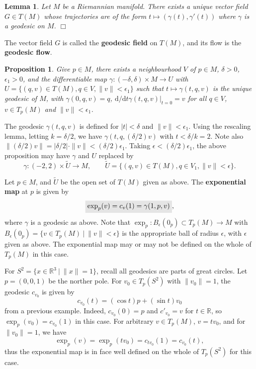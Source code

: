 \documentclass[letter-paper]{tufte-book}
\newtheorem{lemma}[theorem]{\color{pastel-blue}Lemma}
\newtheorem{proposition}[theorem]{\color{pastel-blue}Proposition}
\newenvironment{example}[1][Example]{\begin{trivlist}
\item[\hskip \labelsep {\bfseries #1}]}{\end{trivlist}}
\newcommand{\qedwhite}{\hfill \ensuremath{\Box}}
\newcommand{\highlight}[1]{\mathchoice%
  {\colorbox{black!10}{$\displaystyle#1$}}%
  {\colorbox{black!10}{$\textstyle#1$}}%
  {\colorbox{black!10}{$\scriptstyle#1$}}%
  {\colorbox{black!10}{$\scriptscriptstyle#1$}}}%
\begin{document}
\begin{lemma}
  Let $M$ be a Riemannian manifold. There exists a unique vector field $G \in T(M)$ whose trajectories are of the form $t\mapsto (\gamma(t), \gamma'(t))$ where $\gamma$ is a geodesic on $M$. \qedwhite
\end{lemma}

The vector field $G$ is called the \textbf{geodesic field} on $T(M)$, and its flow is the \textbf{geodesic flow}.

\begin{proposition}
  Give $p\in M$, there exists a neighbourhood $V$ of $p\in M$, $\delta>0$, $\epsilon_1 > 0$, and the differentiable map $\gamma:(-\delta, \delta) \times M \to U$ with $U = \{(q,v)\in T(M), q\in V, \|v\| < \epsilon_1\}$ such that $t\mapsto \gamma(t,q,v)$ is the unique geodesic of $M$, with $\gamma(0, q, v) = q$, $\mathrm{d}/\mathrm{d}t \gamma(t,q,v)|_{t=0} = v$ for all $q\in V$, $v\in T_p(M)$ and $\|v\| < \epsilon_1$.
\end{proposition}

The geodesic $\gamma(t,q,v)$ is defined for $|t|<\delta$ and $\|v\|<\epsilon_1$. Using the rescaling lemma, letting $k=\delta/2$, we have $\gamma(t,q, (\delta/2) v)$ with $t < \delta/k = 2$. Note also $\|(\delta/2)v\| = |\delta/2|\cdot \|v\| < (\delta /2)\epsilon_1$. Taking $\epsilon < (\delta/2)\epsilon_1$, the above proposition may have $\gamma$ and $U$ replaced by
\begin{equation*}
  \gamma:(-2, 2) \times \tilde{U} \to M, \qquad \tilde{U} = \{(q,v) \in T(M), q\in V_1, \|v\|<\epsilon\}.
\end{equation*}

Let $p\in M$, and $\tilde{U}$ be the open set of $T(M)$ given as above. The \textbf{exponential map} at $p$ is given by
\begin{equation}
  \highlight{\exp_p (v) = c_v(1) = \gamma(1, p, v)},
\end{equation}
where $\gamma$ is a geodesic as above. Note that $\exp_p : B_\epsilon(0_p) \subset T_p(M) \to M$ with $B_\epsilon(0_p) = \{v\in T_p(M)\ |\ \|v\|<\epsilon\}$ is the appropriate ball of radius $\epsilon$, with $\epsilon$ given as above. The exponential map may or may not be defined on the whole of $T_p(M)$ in this case.

\begin{example}
  For $S^2 = \{x\in \mathbb{R}^3\ |\ \|x\|=1\}$, recall all geodesics are parts of great circles. Let $p=(0,0,1)$ be the norther pole. For $v_0 \in T_p(S^2)$ with $\|v_0\|=1$, the geodesic $c_{v_0}$ is given by
  \begin{equation*}
    c_{v_0}(t) = (\cos t) p + (\sin t)v_0
  \end{equation*}
  from a previous example. Indeed, $c_{v_0}(0) = p$ and $c'_{v_0} = v$ for $t\in\mathbb{R}$, so $\exp_p(v_0) = c_{v_0}(1)$ in this case. For arbitrary $v\in T_p(M)$, $v = t v_0$, and for $\|v_0\|=1$, we have
  \begin{equation*}
    \exp_p(v) = \exp_p(tv_0) = c_{tv_0}(1) = c_{v_0}(t),
  \end{equation*}
  thus the exponential map is in face well defined on the whole of $T_p(S^2)$ for this case.
\end{example}
\end{document}
